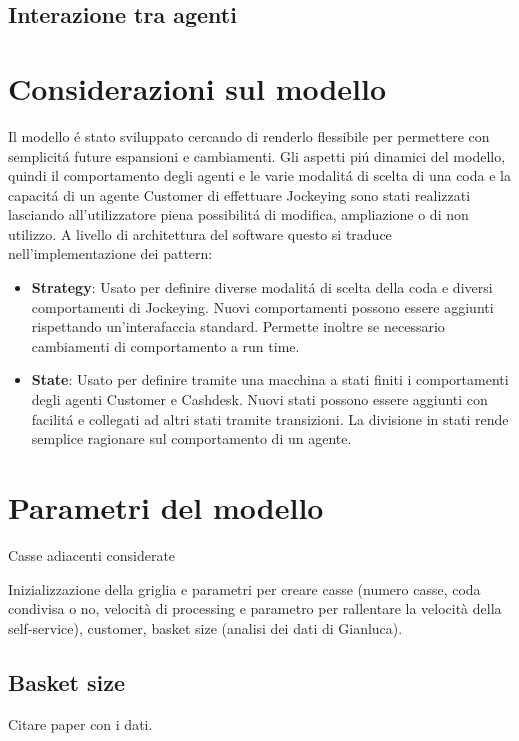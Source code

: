 \subsection{Interazione tra agenti}

\section{Considerazioni sul modello}

Il modello é stato sviluppato cercando di renderlo flessibile per
permettere con semplicitá future espansioni e cambiamenti. Gli aspetti
piú dinamici del modello, quindi il comportamento degli agenti e le
varie modalitá di scelta di una coda e la capacitá di un agente
Customer di effettuare Jockeying sono stati realizzati lasciando
all'utilizzatore piena possibilitá di modifica, ampliazione o di non
utilizzo. A livello di architettura del software questo si traduce
nell'implementazione dei pattern:

\begin{itemize}
\item \textbf{Strategy}: Usato per definire diverse modalitá di scelta
  della coda e diversi comportamenti di Jockeying. Nuovi comportamenti
  possono essere aggiunti rispettando un'interafaccia
  standard. Permette inoltre se necessario cambiamenti di
  comportamento a run time.
\item \textbf{State}: Usato per definire tramite una macchina a stati
  finiti i comportamenti degli agenti Customer e Cashdesk. Nuovi stati
  possono essere aggiunti con facilitá e collegati ad altri stati
  tramite transizioni. La divisione in stati rende semplice ragionare
  sul comportamento di un agente.
\end{itemize}

\section{Parametri del modello}
\label{model:parameters}

Casse adiacenti considerate

Inizializzazione della griglia e parametri per creare casse (numero casse, coda condivisa o no, velocità di processing e parametro per rallentare la velocità della self-service), customer, basket size (analisi dei dati di Gianluca).

\subsection{Basket size}
Citare paper con i dati.

